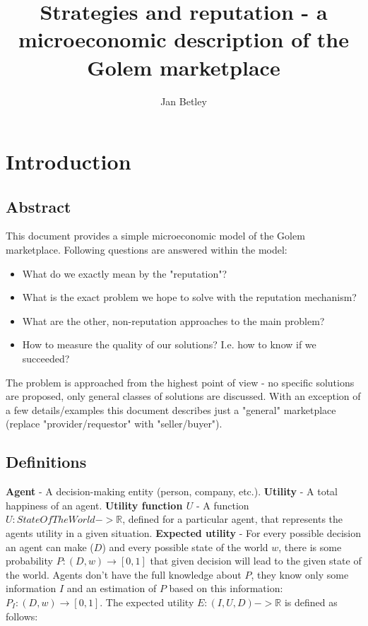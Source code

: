 \documentclass{article}
\title{Strategies and reputation - a microeconomic description of the Golem marketplace}
\author{Jan Betley}
\begin{document}
\maketitle
\section{Introduction}
\subsection{Abstract}
This document provides a simple microeconomic model of the Golem marketplace. 
Following questions are answered within the model:

\begin{itemize}
\item What do we exactly mean by the "reputation"?
\item What is the exact problem we hope to solve with the reputation mechanism?
\item What are the other, non-reputation approaches to the main problem?
\item How to measure the quality of our solutions? I.e. how to know if we succeeded?
\end{itemize}


The problem is approached from the highest point of view - no specific solutions are proposed, only general classes of solutions are discussed.
With an exception of a few details/examples this document describes just a "general" marketplace (replace "provider/requestor" with "seller/buyer").

\subsection{Definitions}

\textbf{Agent} - A decision-making entity (person, company, etc.).
\newline
\textbf{Utility} - A total happiness of an agent.
\newline
\textbf{Utility function $U$} - A function $U: StateOfTheWorld -> \mathbb{R}$, defined for a particular agent, that represents the agents utility in a given situation.
\newline
\textbf{Expected utility} - For every possible decision an agent can make ($D$) and every possible state of the world $w$, there is some probability $P: (D, w) \rightarrow [0, 1]$  that given decision will lead to the given state of the world.
Agents don't have the full knowledge about $P$, they know only some information $I$ and an estimation of $P$ based on this information: $P_I: (D, w) \rightarrow [0, 1]$. The expected utility $E: (I, U, D) -> \mathbb{R}$ is defined as follows:
\end{document}
